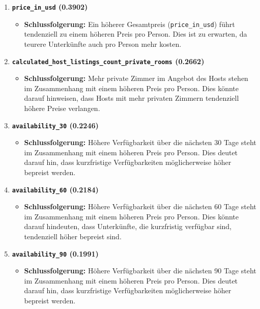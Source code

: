 \documentclass[
  journal,
]{IEEEtran}%
\providecommand{\tightlist}{%
  \setlength{\itemsep}{0pt}\setlength{\parskip}{0pt}}\usepackage{longtable,booktabs,array}
\begin{document}
\begin{enumerate}
\def\labelenumi{\arabic{enumi}.}
\item
  \textbf{\texttt{price\_in\_usd} (0.3902)}

  \begin{itemize}
  \tightlist
  \item
    \textbf{Schlussfolgerung:} Ein höherer Gesamtpreis
    (\texttt{price\_in\_usd}) führt tendenziell zu einem höheren Preis
    pro Person. Dies ist zu erwarten, da teurere Unterkünfte auch pro
    Person mehr kosten.
  \end{itemize}
\item
  \textbf{\texttt{calculated\_host\_listings\_count\_private\_rooms}
  (0.2662)}

  \begin{itemize}
  \tightlist
  \item
    \textbf{Schlussfolgerung:} Mehr private Zimmer im Angebot des Hosts
    stehen im Zusammenhang mit einem höheren Preis pro Person. Dies
    könnte darauf hinweisen, dass Hosts mit mehr privaten Zimmern
    tendenziell höhere Preise verlangen.
  \end{itemize}
\item
  \textbf{\texttt{availability\_30} (0.2246)}

  \begin{itemize}
  \tightlist
  \item
    \textbf{Schlussfolgerung:} Höhere Verfügbarkeit über die nächsten 30
    Tage steht im Zusammenhang mit einem höheren Preis pro Person. Dies
    deutet darauf hin, dass kurzfristige Verfügbarkeiten möglicherweise
    höher bepreist werden.
  \end{itemize}
\item
  \textbf{\texttt{availability\_60} (0.2184)}

  \begin{itemize}
  \tightlist
  \item
    \textbf{Schlussfolgerung:} Höhere Verfügbarkeit über die nächsten 60
    Tage steht im Zusammenhang mit einem höheren Preis pro Person. Dies
    könnte darauf hindeuten, dass Unterkünfte, die kurzfristig verfügbar
    sind, tendenziell höher bepreist sind.
  \end{itemize}
\item
  \textbf{\texttt{availability\_90} (0.1991)}

  \begin{itemize}
  \tightlist
  \item
    \textbf{Schlussfolgerung:} Höhere Verfügbarkeit über die nächsten 90
    Tage steht im Zusammenhang mit einem höheren Preis pro Person. Dies
    deutet darauf hin, dass kurzfristige Verfügbarkeiten möglicherweise
    höher bepreist werden.
  \end{itemize}
\end{enumerate}
\end{document}
